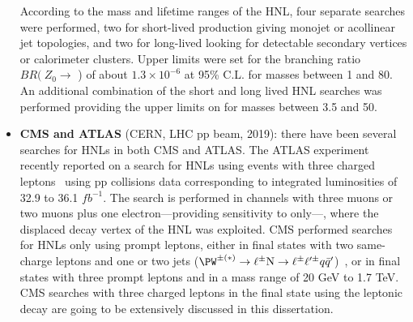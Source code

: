 \begin{itemize}
  According to the mass and lifetime ranges of the HNL, four separate searches were performed, two for short-lived \hnl production giving monojet or acollinear jet topologies, 
  and two for long-lived \hnl looking for detectable secondary vertices or calorimeter clusters.
 Upper limits were set for the branching ratio $BR (\: Z_0\rightarrow$ \hnl) of
 about $1.3 \times 10^{-6}$ at 95\% C.L. for \hnl masses between 1 and
 80\GeV. An additional combination of the short and long lived HNL searches was performed providing the upper limits on \mixpar for \hnl masses between 3.5 and
 50\GeV. 
\item \textbf{CMS and ATLAS} (CERN, LHC pp beam, 2019): there have been several searches for HNLs in both CMS and ATLAS.
The ATLAS experiment recently reported on a search for HNLs using events with three charged leptons~\cite{atlasintro2} using 
pp collisions data corresponding to integrated luminosities of 32.9 to
36.1 $fb^{-1}$. 
The search is performed in channels with three muons or two muons plus
one electron---providing sensitivity  to \mixparm only---, where the 
displaced decay vertex of the HNL was exploited.
CMS performed searches for HNLs only using prompt leptons,
either in final states with two same-charge leptons and one or two jets
(\(\PW^{\pm(\ast)}\to\ell^{\pm}\hnl\to\ell^{\pm}\ell^{\prime\pm}q\bar{q}^{\prime}\))~\cite{Sirunyan:2018xiv},
or in final states with three prompt leptons and \ptmiss 
in a mass range of 20 GeV to 1.7 TeV.
CMS searches with three charged leptons in the final state using the leptonic \PW decay are going to be extensively discussed in this
dissertation.
\end{itemize}

